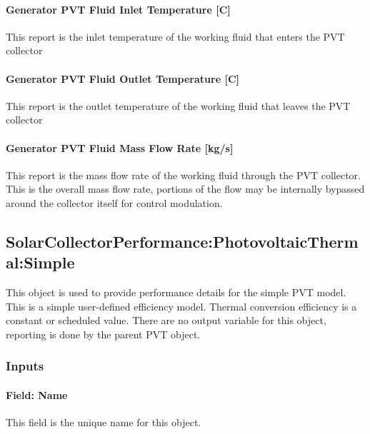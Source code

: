 \paragraph{Generator PVT Fluid Inlet Temperature {[}C{]}}\label{generator-pvt-fluid-inlet-temperature-c}

This report is the inlet temperature of the working fluid that enters the PVT collector

\paragraph{Generator PVT Fluid Outlet Temperature {[}C{]}}\label{generator-pvt-fluid-outlet-temperature-c}

This report is the outlet temperature of the working fluid that leaves the PVT collector

\paragraph{Generator PVT Fluid Mass Flow Rate {[}kg/s{]}}\label{generator-pvt-fluid-mass-flow-rate-kgs}

This report is the mass flow rate of the working fluid through the PVT collector. This is the overall mass flow rate, portions of the flow may be internally bypassed around the collector itself for control modulation.

\subsection{SolarCollectorPerformance:PhotovoltaicThermal:Simple}\label{solarcollectorperformancephotovoltaicthermalsimple}

This object is used to provide performance details for the simple PVT model. This is a simple user-defined efficiency model. Thermal conversion efficiency is a constant or scheduled value. There are no output variable for this object, reporting is done by the parent PVT object.

\subsubsection{Inputs}\label{inputs-5-029}

\paragraph{Field: Name}\label{field-name-5-023}

This field is the unique name for this object.

